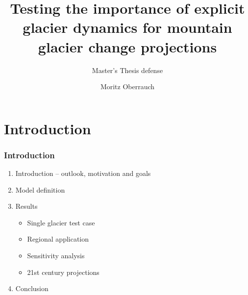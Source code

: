 \documentclass[12pt, aspectratio=169, abstract=off, oneside]{beamer}
\begin{document}
	\title{Testing the importance of explicit glacier dynamics for mountain glacier change projections}
    \subtitle{Master's Thesis defense}
    \author{Moritz Oberrauch}
    \thispagestyle{empty}
    \frame[noframenumbering]{\titlepage}

\section{Introduction} %
\label{sec:introduction}

    \begin{frame}[t]\frametitle{Introduction}
        \begin{enumerate}
            \item<1-> Introduction – outlook, motivation and goals
            \item<2-> Model definition
            \item<3-> Results
                \begin{itemize}
                    \item<4-> Single glacier test case
                    \item<5-> Regional application
                    \item<6-> Sensitivity analysis
                    \item<7-> 21st century projections
                \end{itemize}
            \item<8> Conclusion
                
        \end{enumerate}
        
    
    
    \end{frame}
\end{document}
